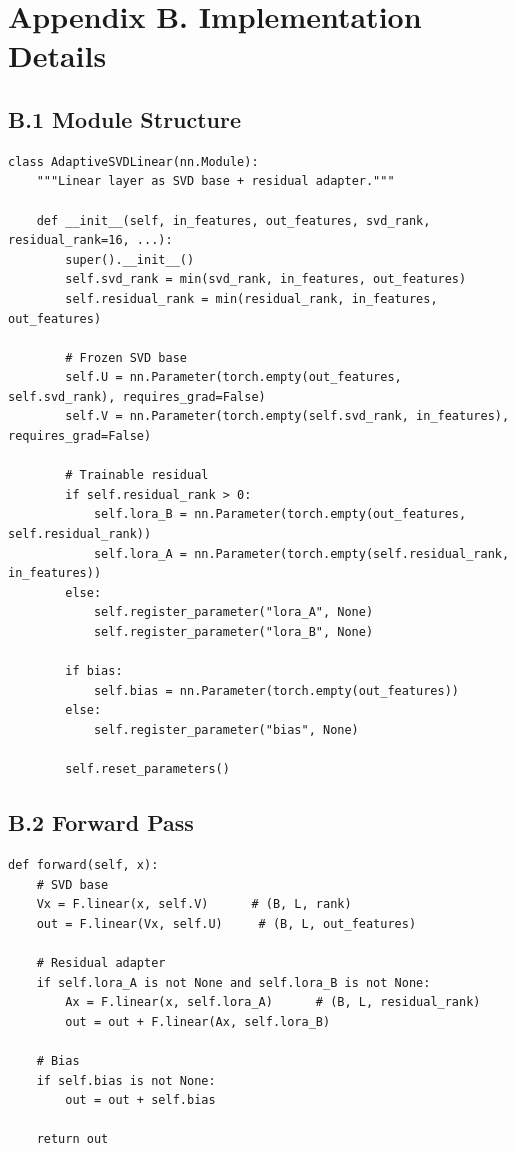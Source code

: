 
\section{Appendix B. Implementation Details}

\subsection{B.1 Module Structure}

\begin{lstlisting}
class AdaptiveSVDLinear(nn.Module):
    """Linear layer as SVD base + residual adapter."""
    
    def __init__(self, in_features, out_features, svd_rank, residual_rank=16, ...):
        super().__init__()
        self.svd_rank = min(svd_rank, in_features, out_features)
        self.residual_rank = min(residual_rank, in_features, out_features)
        
        # Frozen SVD base
        self.U = nn.Parameter(torch.empty(out_features, self.svd_rank), requires_grad=False)
        self.V = nn.Parameter(torch.empty(self.svd_rank, in_features), requires_grad=False)
        
        # Trainable residual
        if self.residual_rank > 0:
            self.lora_B = nn.Parameter(torch.empty(out_features, self.residual_rank))
            self.lora_A = nn.Parameter(torch.empty(self.residual_rank, in_features))
        else:
            self.register_parameter("lora_A", None)
            self.register_parameter("lora_B", None)
        
        if bias:
            self.bias = nn.Parameter(torch.empty(out_features))
        else:
            self.register_parameter("bias", None)
        
        self.reset_parameters()
\end{lstlisting}

\subsection{B.2 Forward Pass}

\begin{lstlisting}
def forward(self, x):
    # SVD base
    Vx = F.linear(x, self.V)      # (B, L, rank)
    out = F.linear(Vx, self.U)     # (B, L, out_features)
    
    # Residual adapter
    if self.lora_A is not None and self.lora_B is not None:
        Ax = F.linear(x, self.lora_A)      # (B, L, residual_rank)
        out = out + F.linear(Ax, self.lora_B)
    
    # Bias
    if self.bias is not None:
        out = out + self.bias
    
    return out
\end{lstlisting}

